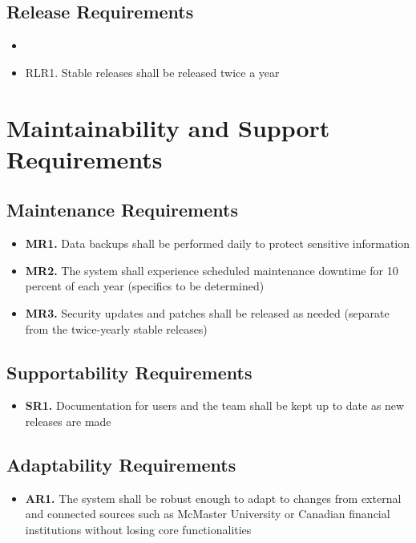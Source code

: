 \documentclass[12pt]{article}
\begin{document}
\subsection{Release Requirements}
\begin{itemize}
    \item \item{RLR1. }Stable releases shall be released twice a year
\end{itemize}

\section{Maintainability and Support Requirements}
\subsection{Maintenance Requirements}
\begin{itemize}
    \item \textbf{MR1. } Data backups shall be performed daily to protect sensitive information
    \item \textbf{MR2. } The system shall experience scheduled maintenance downtime for 10 percent of each year (specifics to be determined)
    \item \textbf{MR3. } Security updates and patches shall be released as needed (separate from the twice-yearly stable releases)
\end{itemize}

\subsection{Supportability Requirements}
\begin{itemize}
    \item \textbf{SR1. } Documentation for users and the team shall be kept up to date as new releases are made
\end{itemize}

\subsection{Adaptability Requirements}
\begin{itemize}
    \item \textbf{AR1. } The system shall be robust enough to adapt to changes from external and connected sources such as McMaster University or Canadian financial institutions without losing core functionalities
\end{itemize}
\end{document}
